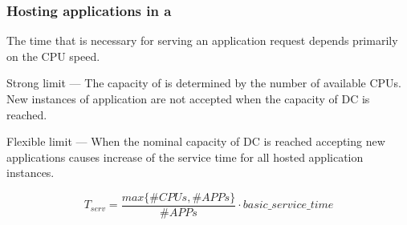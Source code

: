 \subsubsection{Hosting applications in a \dc{}}


The time that is necessary for serving an application request depends primarily on the CPU speed.

Strong limit --- The capacity of \dc{} is determined by the number of available CPUs. New instances of application are not accepted when the capacity of DC is reached.

Flexible limit --- When the nominal capacity of DC is reached accepting new applications causes increase of the service time for all hosted application instances.

\begin{equation}
T_{serv} = \frac{max \lbrace \#CPUs, \#APPs \rbrace}{\#APPs} \cdot basic\_service\_time
\end{equation}

